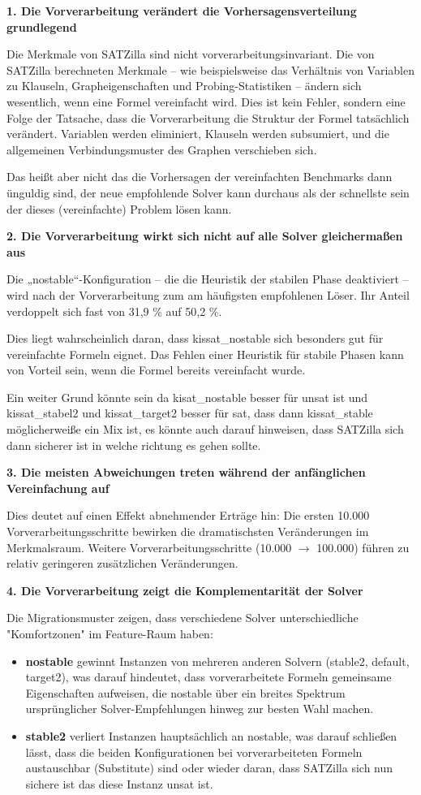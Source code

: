 \textbf{1. Die Vorverarbeitung verändert die Vorhersagensverteilung grundlegend}

Die Merkmale von SATZilla sind nicht vorverarbeitungsinvariant. Die von SATZilla berechneten Merkmale – wie 
beispielsweise das Verhältnis von Variablen zu Klauseln, Grapheigenschaften und Probing-Statistiken – 
ändern sich wesentlich, wenn eine Formel vereinfacht wird. Dies ist kein Fehler, sondern eine Folge 
der Tatsache, dass die Vorverarbeitung die Struktur der Formel tatsächlich verändert. Variablen 
werden eliminiert, Klauseln werden subsumiert, und die allgemeinen Verbindungsmuster des Graphen 
verschieben sich.

Das heißt aber nicht das die Vorhersagen der vereinfachten Benchmarks dann ünguldig sind, der neue 
empfohlende Solver kann durchaus als der schnellste sein der dieses (vereinfachte) Problem lösen kann.

\textbf{2. Die Vorverarbeitung wirkt sich nicht auf alle Solver gleichermaßen aus}

Die „nostable“-Konfiguration – die die Heuristik der stabilen Phase deaktiviert – wird nach der 
Vorverarbeitung zum am häufigsten empfohlenen Löser. Ihr Anteil verdoppelt sich fast von 31,9 \% auf 
50,2 \%.

Dies liegt wahrscheinlich daran, dass kissat\_nostable sich besonders gut für vereinfachte Formeln 
eignet. Das Fehlen einer Heuristik für stabile Phasen kann von Vorteil sein, wenn die Formel bereits 
vereinfacht wurde.

Ein weiter Grund könnte sein da kisat\_nostable besser für unsat ist und kissat\_stabel2 und kissat\_target2 besser für sat, dass 
dann kissat\_stable möglicherweiße ein Mix ist, es könnte auch darauf hinweisen, dass SATZilla sich dann 
sicherer ist in welche richtung es gehen sollte.

\textbf{3. Die meisten Abweichungen treten während der anfänglichen Vereinfachung auf}

Dies deutet auf einen Effekt abnehmender Erträge hin: Die ersten 10.000 Vorverarbeitungsschritte 
bewirken die dramatischsten Veränderungen im Merkmalsraum. Weitere Vorverarbeitungsschritte 
(10.000 $\rightarrow$ 100.000) führen zu relativ geringeren zusätzlichen Veränderungen.

\textbf{4. Die Vorverarbeitung zeigt die Komplementarität der Solver}

Die Migrationsmuster zeigen, dass verschiedene Solver unterschiedliche "Komfortzonen" im Feature-Raum haben:
\begin{itemize}
    \item \textbf{nostable} gewinnt Instanzen von mehreren anderen Solvern (stable2, default, target2), was darauf hindeutet, dass vorverarbeitete Formeln gemeinsame Eigenschaften aufweisen, die nostable über ein breites Spektrum ursprünglicher Solver-Empfehlungen hinweg zur besten Wahl machen.
    \item \textbf{stable2} verliert Instanzen hauptsächlich an nostable, was darauf schließen lässt, dass die beiden Konfigurationen bei vorverarbeiteten Formeln austauschbar (Substitute) sind oder wieder daran, dass SATZilla sich nun sichere ist das diese Instanz unsat ist.  
\end{itemize}

